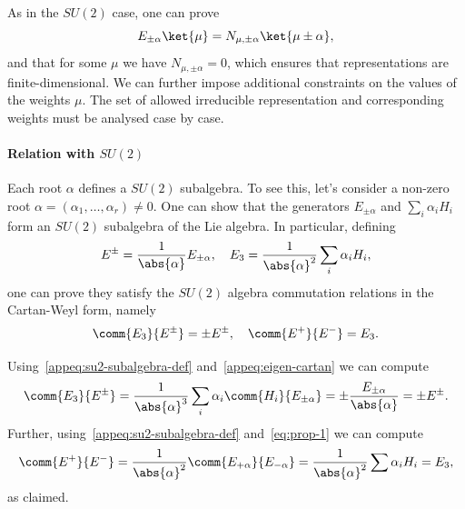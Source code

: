 As in the $SU(2)$ case, one can prove
\begin{equation}\label{appeq:raising-op}
    E_{\pm\alpha} \ket{\mu} = N_{\mu,\pm \alpha} \ket{\mu \pm \alpha},
\end{equation}
and that for some $\mu$ we have $N_{\mu,\pm \alpha} = 0$, which ensures that representations are finite-dimensional. We can further impose additional constraints on the values of the weights $\mu$. The set of allowed irreducible representation and corresponding weights must be analysed case by case.

\paragraph{Relation with \texorpdfstring{$SU(2)$}{SU(2)}}
Each root $\alpha$ defines a $SU(2)$ subalgebra. To see this, let's consider a non-zero root $\alpha = (\alpha_1, \dots, \alpha_r) \neq 0$. One can show that the generators $E_{\pm \alpha}$ and $\sum_i \alpha_i H_i$ form an $SU(2)$ subalgebra of the Lie algebra. In particular, defining
\begin{equation}\label{appeq:su2-subalgebra-def}
    E^\pm = \frac{1}{\abs{\alpha}} E_{\pm \alpha}, \quad E_3 = \frac{1}{\abs{\alpha}^2} \sum_i \alpha_i H_i ,
\end{equation}
one can prove they satisfy the $SU(2)$ algebra commutation relations in the Cartan-Weyl form, namely
\begin{equation}\label{appeq:su2-subalgebra}
     \comm{E_3}{E^\pm} = \pm E^\pm, \quad \comm{E^+}{E^-} = E_3 .
\end{equation}

\begin{mdframed}
\begin{innerproof}
    Using~\eqref{appeq:su2-subalgebra-def} and~\eqref{appeq:eigen-cartan} we can compute
    \begin{equation}
        \comm{E_3}{E^\pm} = \frac{1}{\abs{\alpha}^3} \sum_i \alpha_i \comm{H_i}{E_{\pm\alpha}} = \pm \frac{E_{\pm\alpha}}{\abs{\alpha}} = \pm E^\pm .
    \end{equation}
    Further, using~\eqref{appeq:su2-subalgebra-def} and~\eqref{eq:prop-1} we can compute
    \begin{equation}
        \comm{E^+}{E^-} = \frac{1}{\abs{\alpha}^2} \comm{E_{+\alpha}}{E_{-\alpha}} = \frac{1}{\abs{\alpha}^2} \sum{\alpha_i H_i} = E_3 ,
    \end{equation}
    as claimed.
\end{innerproof}
\end{mdframed}


